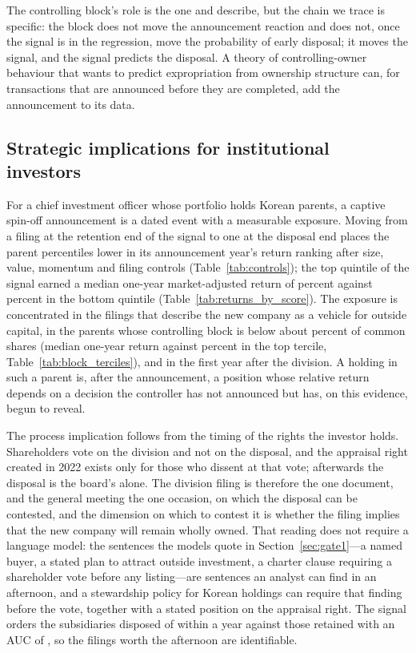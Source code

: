 The controlling block's role is the one  and  describe, but the chain we trace is specific: the block does not move the announcement reaction and does not, once the signal is in the regression, move the probability of early disposal; it moves the signal, and the signal predicts the disposal. A theory of controlling-owner behaviour that wants to predict expropriation from ownership structure can, for transactions that are announced before they are completed, add the announcement to its data.

\subsection{Strategic implications for institutional investors}\label{sec:practitioner}

For a chief investment officer whose portfolio holds Korean parents, a captive spin-off announcement is a dated event with a measurable exposure. Moving from a filing at the retention end of the signal to one at the disposal end places the parent \RankSpecThreePctl{} percentiles lower in its announcement year's return ranking after size, value, momentum and filing controls (Table~\ref{tab:controls}); the top quintile of the signal earned a median one-year market-adjusted return of \QFiveMedian{} percent against \QOneMedian{} percent in the bottom quintile (Table~\ref{tab:returns_by_score}). The exposure is concentrated in the filings that describe the new company as a vehicle for outside capital, in the parents whose controlling block is below about \LowBlockMax{} percent of common shares (median one-year return \LowBlockMedian{} against \HighBlockMedian{} percent in the top tercile, Table~\ref{tab:block_terciles}), and in the first year after the division. A holding in such a parent is, after the announcement, a position whose relative return depends on a decision the controller has not announced but has, on this evidence, begun to reveal.

The process implication follows from the timing of the rights the investor holds. Shareholders vote on the division and not on the disposal, and the appraisal right created in 2022 exists only for those who dissent at that vote; afterwards the disposal is the board's alone. The division filing is therefore the one document, and the general meeting the one occasion, on which the disposal can be contested, and the dimension on which to contest it is whether the filing implies that the new company will remain wholly owned. That reading does not require a language model: the sentences the models quote in Section~\ref{sec:gate1}---a named buyer, a stated plan to attract outside investment, a charter clause requiring a shareholder vote before any listing---are sentences an analyst can find in an afternoon, and a stewardship policy for Korean holdings can require that finding before the vote, together with a stated position on the appraisal right. The signal orders the subsidiaries disposed of within a year against those retained with an AUC of \AUCEarlyPooled{}, so the filings worth the afternoon are identifiable.

